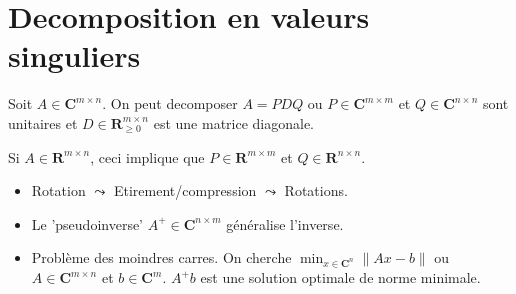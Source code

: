 \section{Decomposition en valeurs singuliers}

\begin{theorem}[SVD]
Soit $A\in \mathbf{C}^{m\times n}$. On peut decomposer $A=PDQ$ ou $P\in \mathbf{C}^{m\times m}$ et $Q\in \mathbf{C}^{n\times n}$ sont unitaires et $D\in \mathbf{R}^{m\times n}_{\ge 0}$ est une matrice diagonale.

Si $A\in \mathbf{R}^{m\times n}$, ceci implique que $P\in \mathbf{R}^{m\times m}$ et $Q\in \mathbf{R}^{n\times n}$.
\end{theorem}
\begin{remark}[Motivation]
\begin{itemize}
\item Rotation $\leadsto$ Etirement/compression $\leadsto$ Rotations.
\item Le 'pseudoinverse' $A^{+}\in \mathbf{C}^{n\times m}$ généralise l'inverse.  
\item Problème des moindres carres. On cherche $\min_{x \in \mathbf{C}^{n}}\lVert Ax-b \rVert$ ou $A\in \mathbf{C}^{m\times n}$ et $b\in \mathbf{C}^{m}$. $A^{+}b$ est une solution optimale de norme minimale.
\end{itemize}
\end{remark}
